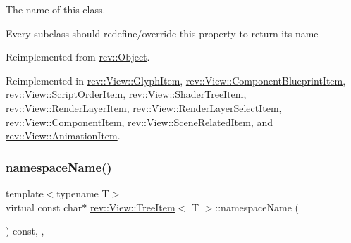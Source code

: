 The name of this class. 

Every subclass should redefine/override this property to return its name 

Reimplemented from \mbox{\hyperlink{classrev_1_1_object_a7a2013f91169479b65cf93afdc5d9a68}{rev\+::\+Object}}.



Reimplemented in \mbox{\hyperlink{classrev_1_1_view_1_1_glyph_item_aeae051c75cc6ac7cccf256041721e840}{rev\+::\+View\+::\+Glyph\+Item}}, \mbox{\hyperlink{classrev_1_1_view_1_1_component_blueprint_item_a735f5d6800e98b51ec826fd4ca05dd91}{rev\+::\+View\+::\+Component\+Blueprint\+Item}}, \mbox{\hyperlink{classrev_1_1_view_1_1_script_order_item_a80f36f0f815218dd2ea9ffb2b145d440}{rev\+::\+View\+::\+Script\+Order\+Item}}, \mbox{\hyperlink{classrev_1_1_view_1_1_shader_tree_item_aa343381f05afa92936c6ffbbe106b2b6}{rev\+::\+View\+::\+Shader\+Tree\+Item}}, \mbox{\hyperlink{classrev_1_1_view_1_1_render_layer_item_ab7fbeef972e54db445d57f71e3ec1ef5}{rev\+::\+View\+::\+Render\+Layer\+Item}}, \mbox{\hyperlink{classrev_1_1_view_1_1_render_layer_select_item_a8f14c80f13b45c055eeab73af921535b}{rev\+::\+View\+::\+Render\+Layer\+Select\+Item}}, \mbox{\hyperlink{classrev_1_1_view_1_1_component_item_ab841f5681c0a147d32680d0f3a1f62e7}{rev\+::\+View\+::\+Component\+Item}}, \mbox{\hyperlink{classrev_1_1_view_1_1_scene_related_item_ae2eff65bbbea3332ccdc41fb85a1f270}{rev\+::\+View\+::\+Scene\+Related\+Item}}, and \mbox{\hyperlink{classrev_1_1_view_1_1_animation_item_aa842daa5b936f8b12980b49505cba185}{rev\+::\+View\+::\+Animation\+Item}}.

\mbox{\label{classrev_1_1_view_1_1_tree_item_a3bb552a87176f4b12848e43dfdd287b2}} 
\subsubsection{\texorpdfstring{namespaceName()}{namespaceName()}}
{\footnotesize\ttfamily template$<$typename T$>$ \\
virtual const char$\ast$ \mbox{\hyperlink{classrev_1_1_view_1_1_tree_item}{rev\+::\+View\+::\+Tree\+Item}}$<$ T $>$\+::namespace\+Name (\begin{DoxyParamCaption}{ }\end{DoxyParamCaption}) const\hspace{0.3cm}{\ttfamily [inline]}, {\ttfamily [override]}, {\ttfamily [virtual]}}



